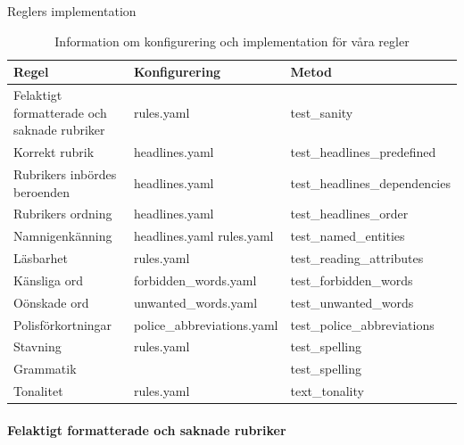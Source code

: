 \documentclass[swedish]{maucsthesis}
\begin{document}
\begin{table}[H]
\centering
\caption{Reglers implementation}
\begin{tabular}{|l|l|l|}
\hline
Regel                                       & Konfigurering             & Metod                                 \\ \hline
Felaktigt formatterade och saknade rubriker & rules.yaml                & test\_sanity                          \\ \hline
Korrekt rubrik                              & headlines.yaml            & test\_headlines\_predefined           \\ \hline
Rubrikers inbördes beroenden                & headlines.yaml            & test\_headlines\_dependencies         \\ \hline
Rubrikers ordning                           & headlines.yaml            & test\_headlines\_order                \\ \hline
Namnigenkänning                             & headlines.yaml rules.yaml & test\_named\_entities                 \\ \hline
Läsbarhet                                   & rules.yaml                & test\_reading\_attributes             \\ \hline
Känsliga ord                                & forbidden\_words.yaml     & test\_forbidden\_words                \\ \hline
Oönskade ord                                & unwanted\_words.yaml      & test\_unwanted\_words                 \\ \hline
Polisförkortningar                          & police\_abbreviations.yaml    & test\_police\_abbreviations \\ \hline
Stavning                                    & rules.yaml                & test\_spelling                        \\ \hline
Grammatik                                   &                           & test\_spelling                        \\ \hline
Tonalitet                                   & rules.yaml                & text\_tonality                        \\ \hline
\end{tabular}
\caption*{Information om konfigurering och implementation för våra regler}
\label{implementationconfigurationtable}
\end{table}

\paragraph*{Felaktigt formatterade och saknade rubriker}
\end{document}
